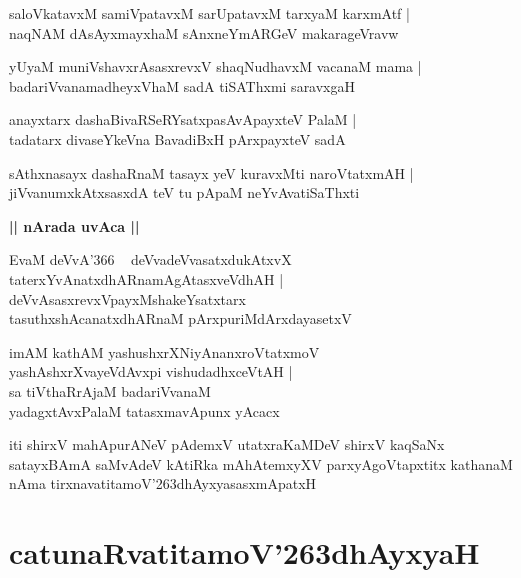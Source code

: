 \documentclass[twoside,12pt,openright]{book}
\def\S{\char'263}
\newcounter{shloka}[chapter]
\def\uvaca#1{\centerline{{\large\textbf{#1}}}}
\begin{document}
\begin{shloka}%
saloVkatavxM samiVpatavxM sarUpatavxM tarxyaM karxmAtf |\\
naqNAM dAsAyxmayxhaM sAnxneYmARGeV makarageVravw
\end{shloka}

\begin{shloka}%
yUyaM muniVshavxrAsasxrevxV shaqNudhavxM vacanaM mama |\\
badariVvanamadheyxVhaM sadA tiSAThxmi saravxgaH 
\end{shloka}

\begin{shloka}%
anayxtarx dashaBivaRSeRYsatxpasAvApayxteV PalaM |\\
tadatarx divaseYkeVna BavadiBxH pArxpayxteV sadA 
\end{shloka}

\begin{shloka}%
sAthxnasayx dashaRnaM tasayx yeV kuravxMti naroVtatxmAH |\\
jiVvanumxkAtxsasxdA teV tu pApaM neYvAvatiSaThxti 
\end{shloka}

\uvaca{|| nArada uvAca ||}

\begin{shloka}%
EvaM deVvA\char'366 ~ deVvadeVvasatxdukAtxvX \\
taterxYvAnatxdhARnamAgAtasxveVdhAH |\\
deVvAsasxrevxVpayxMshakeYsatxtarx \\
tasuthxshAcanatxdhARnaM pArxpuriMdArxdayasetxV 
\end{shloka}

\begin{shloka}%
imAM kathAM yashushxrXNiyAnanxroVtatxmoV \\
yashAshxrXvayeVdAvxpi vishudadhxceVtAH |\\
sa tiVthaRrAjaM badariVvanaM \\
yadagxtAvxPalaM tatasxmavApunx yAcacx
\end{shloka}

\begin{center}
iti shirxV mahApurANeV pAdemxV utatxraKaMDeV shirxV kaqSaNx satayxBAmA saMvAdeV kAtiRka mAhAtemxyXV 
parxyAgoVtapxtitx kathanaM nAma tirxnavatitamoV\S dhAyxyasasxmApatxH 
\end{center}

\chapter{catunaRvatitamoV\S dhAyxyaH}
\end{document}

